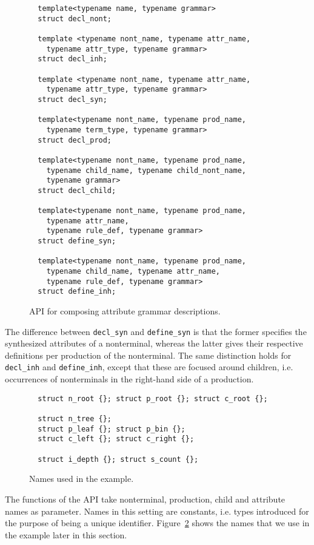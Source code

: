 \documentclass{llncs}
\begin{document}
  \begin{figure}[ht]
  \begin{lstlisting}
  template<typename name, typename grammar>
  struct decl_nont;

  template <typename nont_name, typename attr_name,
    typename attr_type, typename grammar>
  struct decl_inh;

  template <typename nont_name, typename attr_name,
    typename attr_type, typename grammar>
  struct decl_syn;

  template<typename nont_name, typename prod_name,
    typename term_type, typename grammar>
  struct decl_prod;

  template<typename nont_name, typename prod_name,
    typename child_name, typename child_nont_name,
    typename grammar>
  struct decl_child;

  template<typename nont_name, typename prod_name,
    typename attr_name,
    typename rule_def, typename grammar>
  struct define_syn;

  template<typename nont_name, typename prod_name,
    typename child_name, typename attr_name,
    typename rule_def, typename grammar>
  struct define_inh;
  \end{lstlisting}
  \caption{API for composing attribute grammar descriptions.}
  \label{fig:api}
  \end{figure}

  The difference between \lstinline$decl_syn$ and \lstinline$define_syn$
  is that the former specifies the synthesized attributes of a nonterminal,
  whereas the latter gives their respective definitions per production of the
  nonterminal. The same distinction holds for \lstinline$decl_inh$ and
  \lstinline$define_inh$, except that these are focused around
  children, i.e. occurrences of nonterminals in the right-hand side of a
  production.

  \begin{figure}[tb]
  \begin{lstlisting}
  struct n_root {}; struct p_root {}; struct c_root {};

  struct n_tree {};
  struct p_leaf {}; struct p_bin {};
  struct c_left {}; struct c_right {};

  struct i_depth {}; struct s_count {};
  \end{lstlisting}
  \caption{Names used in the example.}
  \label{fig:idents}
  \end{figure}

  The functions of the API take nonterminal, production,
  child and attribute names as parameter. Names in this
  setting are constants, i.e.
  types introduced for the purpose of being a unique
  identifier. Figure~\ref{fig:idents} shows the names that
  we use in the example later in this section.
\end{document}
